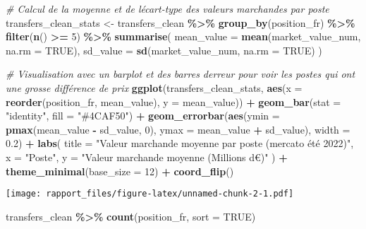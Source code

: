 \documentclass[
]{article}
\newenvironment{Shaded}{\begin{snugshade}}{\end{snugshade}}
\newcommand{\AttributeTok}[1]{\textcolor[rgb]{0.13,0.29,0.53}{#1}}
\newcommand{\CommentTok}[1]{\textcolor[rgb]{0.56,0.35,0.01}{\textit{#1}}}
\newcommand{\ConstantTok}[1]{\textcolor[rgb]{0.56,0.35,0.01}{#1}}
\newcommand{\DecValTok}[1]{\textcolor[rgb]{0.00,0.00,0.81}{#1}}
\newcommand{\FloatTok}[1]{\textcolor[rgb]{0.00,0.00,0.81}{#1}}
\newcommand{\FunctionTok}[1]{\textcolor[rgb]{0.13,0.29,0.53}{\textbf{#1}}}
\newcommand{\NormalTok}[1]{#1}
\newcommand{\OtherTok}[1]{\textcolor[rgb]{0.56,0.35,0.01}{#1}}
\newcommand{\SpecialCharTok}[1]{\textcolor[rgb]{0.81,0.36,0.00}{\textbf{#1}}}
\newcommand{\StringTok}[1]{\textcolor[rgb]{0.31,0.60,0.02}{#1}}
\begin{document}
\begin{Shaded}
\begin{Highlighting}[]
\CommentTok{\# Calcul de la moyenne et de l\textquotesingle{}écart{-}type des valeurs marchandes par poste}
\NormalTok{transfers\_clean\_stats }\OtherTok{\textless{}{-}}\NormalTok{ transfers\_clean }\SpecialCharTok{\%\textgreater{}\%}
  \FunctionTok{group\_by}\NormalTok{(position\_fr) }\SpecialCharTok{\%\textgreater{}\%}
  \FunctionTok{filter}\NormalTok{(}\FunctionTok{n}\NormalTok{() }\SpecialCharTok{\textgreater{}=} \DecValTok{5}\NormalTok{) }\SpecialCharTok{\%\textgreater{}\%}  
  \FunctionTok{summarise}\NormalTok{(}
    \AttributeTok{mean\_value =} \FunctionTok{mean}\NormalTok{(market\_value\_num, }\AttributeTok{na.rm =} \ConstantTok{TRUE}\NormalTok{),}
    \AttributeTok{sd\_value =} \FunctionTok{sd}\NormalTok{(market\_value\_num, }\AttributeTok{na.rm =} \ConstantTok{TRUE}\NormalTok{)}
\NormalTok{  )}

\CommentTok{\# Visualisation avec un barplot et des barres d\textquotesingle{}erreur pour voir les postes qui ont une grosse différence de prix}
\FunctionTok{ggplot}\NormalTok{(transfers\_clean\_stats, }\FunctionTok{aes}\NormalTok{(}\AttributeTok{x =} \FunctionTok{reorder}\NormalTok{(position\_fr, mean\_value), }\AttributeTok{y =}\NormalTok{ mean\_value)) }\SpecialCharTok{+}
  \FunctionTok{geom\_bar}\NormalTok{(}\AttributeTok{stat =} \StringTok{"identity"}\NormalTok{, }\AttributeTok{fill =} \StringTok{"\#4CAF50"}\NormalTok{) }\SpecialCharTok{+}  
  \FunctionTok{geom\_errorbar}\NormalTok{(}\FunctionTok{aes}\NormalTok{(}\AttributeTok{ymin =} \FunctionTok{pmax}\NormalTok{(mean\_value }\SpecialCharTok{{-}}\NormalTok{ sd\_value, }\DecValTok{0}\NormalTok{), }\AttributeTok{ymax =}\NormalTok{ mean\_value }\SpecialCharTok{+}\NormalTok{ sd\_value), }\AttributeTok{width =} \FloatTok{0.2}\NormalTok{) }\SpecialCharTok{+}
  \FunctionTok{labs}\NormalTok{(}
    \AttributeTok{title =} \StringTok{"Valeur marchande moyenne par poste (mercato été 2022)"}\NormalTok{,}
    \AttributeTok{x =} \StringTok{"Poste"}\NormalTok{,}
    \AttributeTok{y =} \StringTok{"Valeur marchande moyenne (Millions d\textquotesingle{}€)"}
\NormalTok{  ) }\SpecialCharTok{+}
  \FunctionTok{theme\_minimal}\NormalTok{(}\AttributeTok{base\_size =} \DecValTok{12}\NormalTok{) }\SpecialCharTok{+}
  \FunctionTok{coord\_flip}\NormalTok{()}
\end{Highlighting}
\end{Shaded}

\texttt{[image: rapport\_files/figure-latex/unnamed-chunk-2-1.pdf]}

\begin{Shaded}
\begin{Highlighting}[]
\NormalTok{transfers\_clean }\SpecialCharTok{\%\textgreater{}\%}
  \FunctionTok{count}\NormalTok{(position\_fr, }\AttributeTok{sort =} \ConstantTok{TRUE}\NormalTok{)}
\end{Highlighting}
\end{Shaded}
\end{document}
